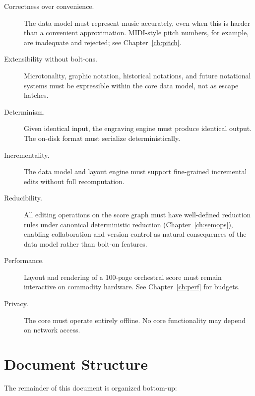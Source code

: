 \documentclass[11pt,letterpaper]{report}
\begin{document}
\begin{description}
  \item[Correctness over convenience.] The data model must represent
    music accurately, even when this is harder than a convenient
    approximation. MIDI-style pitch numbers, for example, are inadequate
    and rejected; see Chapter~\ref{ch:pitch}.
  \item[Extensibility without bolt-ons.] Microtonality, graphic notation,
    historical notations, and future notational systems must be
    expressible within the core data model, not as escape hatches.
  \item[Determinism.] Given identical input, the engraving engine must
    produce identical output. The on-disk format must serialize
    deterministically.
  \item[Incrementality.] The data model and layout engine must support
    fine-grained incremental edits without full recomputation.
  \item[Reducibility.] All editing operations on the score graph
    must have well-defined reduction rules under canonical
    deterministic reduction (Chapter~\ref{ch:semops}), enabling
    collaboration and version control as natural consequences of
    the data model rather than bolt-on features.
  \item[Performance.] Layout and rendering of a 100-page orchestral score
    must remain interactive on commodity hardware. See
    Chapter~\ref{ch:perf} for budgets.
  \item[Privacy.] The core must operate entirely offline. No core
    functionality may depend on network access.
\end{description}

\section{Document Structure}

The remainder of this document is organized bottom-up:
\end{document}
